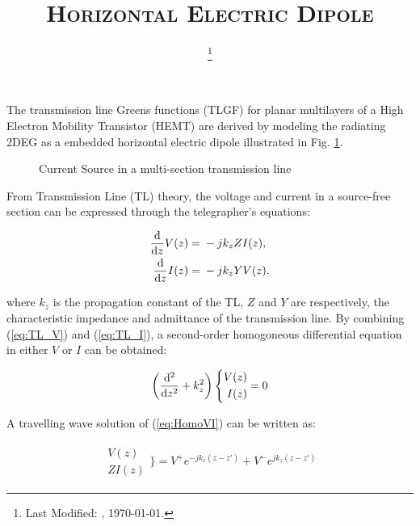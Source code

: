 \documentclass[11pt]{article}
\renewcommand{\^}{\hat}  %
\begin{document}
  \title{\textsc{Horizontal Electric Dipole}\\}
  \date{\footnote{Last Modified: \currenttime, \today.}}
  \maketitle
  The transmission line Greens functions (TLGF) for planar multilayers of a High Electron Mobility Transistor (HEMT) are derived by modeling the radiating 2DEG as a embedded horizontal electric dipole illustrated in Fig. \ref{fig:structure}.

  \begin{figure}[h!]
    \centering
    
    \caption{Current Source in a multi-section transmission line}
    \label{fig:structure}
  \end{figure}


  From Transmission Line (TL) theory, the voltage and current in a source-free section can be expressed through the telegrapher's equations:

  \begin{subequations}
    \begin{align}
      \dv{}{z}{V(z)} ={}& -jk_z Z I(z),
      \label{eq:TL_V}\\
      \dv{}{z}{I(z)} ={}& -jk_z Y V(z).
      \label{eq:TL_I}
    \end{align}
    \label{eq:TL}
  \end{subequations}

  where $k_z$ is the propagation constant of the TL, $Z$ and $Y$ are respectively, the characteristic impedance and admittance of the transmission line. By combining (\ref{eq:TL_V}) and (\ref{eq:TL_I}), a second-order homogoneous differential equation in either $V$ or $I$ can be obtained:

  \begin{align}
    \left( \dv[2]{}{z} + k_z^2 \right) \Bigg \{
    \begin{split}
      V(z)\\
      I(z)
      \end{split} = 0
      \label{eq:HomoVI}
    \end{align}

    A travelling wave solution of (\ref{eq:HomoVI}) can be written as:

    \begin{align}
      \begin{split}
        V(z)\\
        Z I(z)
      \end{split} \Bigg \}= V^+ e^{-jk_z (z-z')} + V^- e^{jk_z (z-z')}
      \label{eq:homo_sol}
    \end{align}
\end{document}
